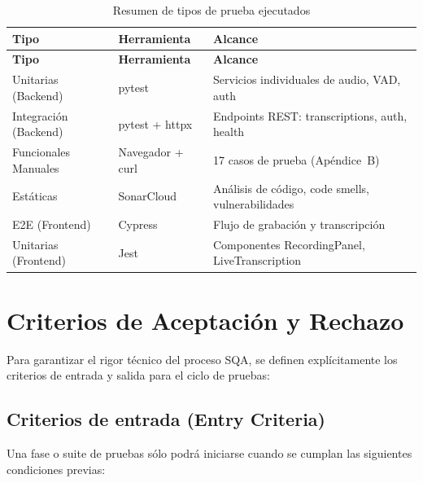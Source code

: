 \begin{longtable}{llp{5cm}}
\caption{Resumen de tipos de prueba ejecutados}
\label{tab:tipos-prueba}\\
\toprule
\textbf{Tipo} & \textbf{Herramienta} & \textbf{Alcance}\\
\midrule
\endfirsthead
\toprule
\textbf{Tipo} & \textbf{Herramienta} & \textbf{Alcance}\\
\midrule
\endhead
\bottomrule
\endfoot

Unitarias (Backend) & pytest & Servicios individuales de audio, VAD, auth\\

Integración (Backend) & pytest + httpx & Endpoints REST: transcriptions, auth, health\\

Funcionales Manuales & Navegador + curl & 17 casos de prueba (Apéndice~B)\\

Estáticas & SonarCloud & Análisis de código, code smells, vulnerabilidades\\

E2E (Frontend) & Cypress & Flujo de grabación y transcripción\\

Unitarias (Frontend) & Jest & Componentes RecordingPanel, LiveTranscription\\

\end{longtable}

\section{Criterios de Aceptación y Rechazo}
\label{sec:criterios}

Para garantizar el rigor técnico del proceso SQA, se definen explícitamente los criterios de entrada y salida para el ciclo de pruebas:

\subsection{Criterios de entrada (Entry Criteria)}
\label{subsec:entry}

Una fase o suite de pruebas sólo podrá iniciarse cuando se cumplan las siguientes condiciones previas:

